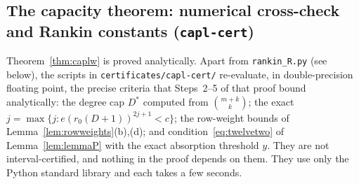 \subsection{The capacity theorem: numerical cross-check and Rankin constants (\texttt{capl-cert})}\label{app:cert-capl}
Theorem~\ref{thm:caplw} is proved analytically. Apart from \texttt{rankin\_R.py} (see below), the scripts in
\texttt{certificates/capl-cert/} re-evaluate, in double-precision
floating point, the precise criteria that Steps~2--5 of that proof bound analytically: the degree cap $D^*$ computed from
$\binom{m+k}{k}$; the exact $j=\max\{j:e(r_0(D+1))^{2j+1}<c\}$; the row-weight bounds of Lemma~\ref{lem:rowweights}(b),(d); and
condition~\eqref{eq:twelvetwo} of Lemma~\ref{lem:lemmaP} with the exact absorption threshold $y$. They are not interval-certified, and
nothing in the proof depends on them. They use only the Python standard library and each takes a few seconds.
